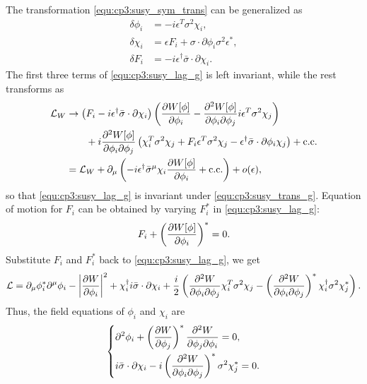\begin{problembody}
    \item The transformation \eqref{equ:cp3:susy_sym_trans} can be generalized as
    \begin{subequations}\label{equ:cp3:susy_trans_g}
        \begin{align}
            \delta\phi_i & = -i\epsilon^T\sigma^2\chi_i,\\
            \delta\chi_i & = \epsilon F_i + \sigma\cdot\partial\phi_i\sigma^2\epsilon^\ast,\\
            \delta F_i & = -i\epsilon^\dagger\bar{\sigma}\cdot\partial\chi_i.
        \end{align}
    \end{subequations}
    The first three terms of \eqref{equ:cp3:susy_lag_g} is left invariant, while the rest transforms as
    \begin{align*}
        \mathcal{L}_W & \to \left(
            F_i - i\epsilon^\dagger\bar{\sigma}\cdot\partial\chi_i
        \right)
        \left(
            \frac{\partial W[\phi]}{\partial \phi_i} 
            - \frac{\partial^2 W[\phi]}{\partial \phi_i\partial \phi_j}i\epsilon^T\sigma^2\chi_j
        \right)\\
        & \qquad + i\frac{\partial^2 W[\phi]}{\partial \phi_i\partial \phi_j}
        \left(
            \chi_i^T\sigma^2\chi_j
            + F_i\epsilon^T\sigma^2\chi_j
            - \epsilon^\dagger\bar{\sigma}\cdot\partial\phi_i\chi_j    
        \right) + \mathrm{c.c.}\\
        & = \mathcal{L}_W + \partial_\mu\left(
            -i\epsilon^\dagger\bar{\sigma}^\mu\chi_i\frac{\partial W[\phi]}{\partial \phi_i} + \mathrm{c.c.}    
        \right) + o(\epsilon),
    \end{align*}
    so that \eqref{equ:cp3:susy_lag_g} is invariant under \eqref{equ:cp3:susy_trans_g}. Equation of motion for $F_i$
    can be obtained by varying $F_i^\ast$ in \eqref{equ:cp3:susy_lag_g}:
    \begin{equation*}
        F_i + \left(\frac{\partial W[\phi]}{\partial \phi_i}\right)^\ast = 0.
    \end{equation*}
    Substitute $F_i$ and $F_i^\ast$ back to \eqref{equ:cp3:susy_lag_g}, we get
    \begin{equation*}
        \mathcal{L} = \partial_\mu\phi_i^\ast\partial^\mu\phi_i
        - \left|\frac{\partial W}{\partial \phi_i}\right|^2
        + \chi_i^\dagger i\bar{\sigma}\cdot\partial\chi_i
        + \frac{i}{2}\left(
            \frac{\partial^2 W}{\partial \phi_i\partial \phi_j}\chi_i^T\sigma^2\chi_j
            - \left(\frac{\partial^2 W}{\partial \phi_i\partial \phi_j}\right)^\ast\chi_i^\dagger\sigma^2\chi_j^\ast
        \right).
    \end{equation*}
    Thus, the field equations of $\phi_i$ and $\chi_i$ are
    \begin{equation*}
        \left\{
        \begin{aligned}
            & \partial^2\phi_i + \left(\frac{\partial W}{\partial \phi_j}\right)^\ast
            \frac{\partial^2 W}{\partial \phi_j\partial \phi_i} = 0,\\
            & i\bar{\sigma}\cdot\partial\chi_i
            - i\left(\frac{\partial^2 W}{\partial \phi_i\partial \phi_j}\right)^\ast\sigma^2\chi_j^\ast = 0.
        \end{aligned}
        \right.
    \end{equation*}
\end{problembody}

